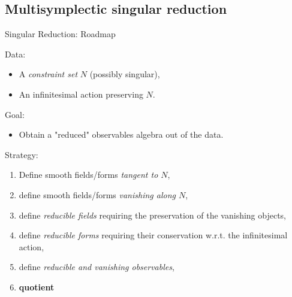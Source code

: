 \documentclass[handout,10pt]{beamer}
\begin{document}
\subsection{Multisymplectic singular reduction}

\begin{frame}{Singular Reduction: Roadmap}
	\begin{block}{Data:}
			\begin{itemize}
				\item A \emph{constraint set} $N$ (possibly singular),
				\item An infinitesimal action preserving $N$.
			\end{itemize}
	\end{block}
	\vfill
	\pause
	\begin{block}{Goal:}
		\begin{itemize}
			\item Obtain a "reduced" observables algebra out of the data.
		\end{itemize}
	\end{block}
	\vfill
	\pause
	\begin{block}{Strategy:}
		\begin{enumerate}
			\item Define smooth fields/forms \emph{tangent to $N$},
			\item define smooth fields/forms \emph{vanishing along $N$},
			\item define \emph{reducible fields} requiring the preservation of the vanishing objects,
			\item define \emph{reducible forms} requiring their conservation w.r.t. the infinitesimal action,
			\item define \emph{reducible and vanishing observables},
			\item \textbf{quotient}
		\end{enumerate}
	\end{block}






\end{frame}

\end{document}
